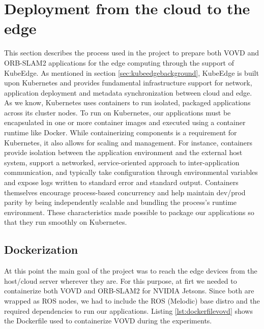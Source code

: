 \section{Deployment from the cloud to the edge}
This section describes the process used in the project to prepare both VOVD and ORB-SLAM2 applications for the edge computing through the support of KubeEdge.
As mentioned in section \ref{sec:kubeedgebackground}, KubeEdge is built upon Kubernetes and provides fundamental infrastructure support for network, application deployment and metadata synchronization between cloud and edge. As we know, Kubernetes uses containers to run isolated, packaged applications across its cluster nodes. To run on Kubernetes, our applications must be encapsulated in one or more container images and executed using a container runtime like Docker. While containerizing components is a requirement for Kubernetes, it also allows for scaling and management. For instance, containers provide isolation between the application environment and the external host system, support a networked, service-oriented approach to inter-application communication, and typically take configuration through environmental variables and expose logs written to standard error and standard output. Containers themselves encourage process-based concurrency and help maintain dev/prod parity by being independently scalable and bundling the process's runtime environment. These characteristics made possible to package our applications so that they run smoothly on Kubernetes.


\subsection{Dockerization}
At this point the main goal of the project was to reach the edge devices from the host/cloud server wherever they are.
For this purpose, at firt we needed to containerize both VOVD and ORB-SLAM2 for NVIDIA Jetsons.
Since both are wrapped as ROS nodes, we had to include the ROS (Melodic) base distro and the required dependencies to run our applications.
Listing \ref{lst:dockerfilevovd} shows the Dockerfile used to containerize VOVD during the experiments.

